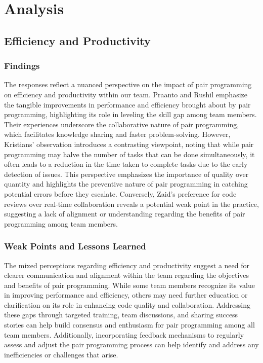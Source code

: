 \section{Analysis}
\subsection{Efficiency and Productivity}
\subsubsection{Findings}
The responses reflect a nuanced perspective on the impact of pair programming on efficiency and productivity within our team. Praanto and Rushil emphasize the tangible improvements in performance and efficiency brought about by pair programming, highlighting its role in leveling the skill gap among team members. Their experiences underscore the collaborative nature of pair programming, which facilitates knowledge sharing and faster problem-solving. However, Kristians' observation introduces a contrasting viewpoint, noting that while pair programming may halve the number of tasks that can be done simultaneously, it often leads to a reduction in the time taken to complete tasks due to the early detection of issues. This perspective emphasizes the importance of quality over quantity and highlights the preventive nature of pair programming in catching potential errors before they escalate. Conversely, Zaid's preference for code reviews over real-time collaboration reveals a potential weak point in the practice, suggesting a lack of alignment or understanding regarding the benefits of pair programming among team members.
\subsubsection{Weak Points and Lessons Learned} 
The mixed perceptions regarding efficiency and productivity suggest a need for clearer communication and alignment within the team regarding the objectives and benefits of pair programming. While some team members recognize its value in improving performance and efficiency, others may need further education or clarification on its role in enhancing code quality and collaboration. Addressing these gaps through targeted training, team discussions, and sharing success stories can help build consensus and enthusiasm for pair programming among all team members. \cite{skill_issue} Additionally, incorporating feedback mechanisms to regularly assess and adjust the pair programming process can help identify and address any inefficiencies or challenges that arise.


